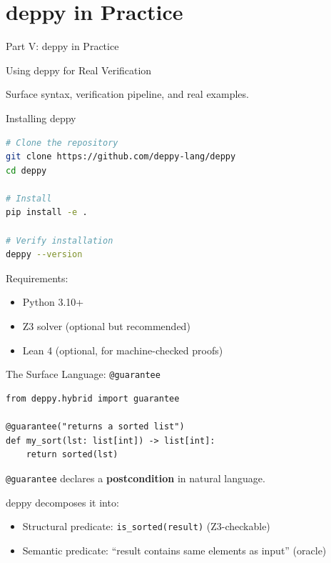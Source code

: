 \documentclass[aspectratio=169,11pt]{beamer}
\begin{document}

\part{deppy in Practice}

\begin{frame}{Part V: deppy in Practice}
\begin{center}
{\Large\color{blue} Using deppy for Real Verification}

\vspace{1em}
Surface syntax, verification pipeline, and real examples.
\end{center}
\end{frame}

\begin{frame}{Installing deppy}
\begin{lstlisting}[language=bash, basicstyle=\small\ttfamily]
# Clone the repository
git clone https://github.com/deppy-lang/deppy
cd deppy

# Install
pip install -e .

# Verify installation
deppy --version
\end{lstlisting}

\vspace{0.5em}
Requirements:
\begin{itemize}
\item Python 3.10+
\item Z3 solver (optional but recommended)
\item Lean 4 (optional, for machine-checked proofs)
\end{itemize}
\end{frame}

\begin{frame}{The Surface Language: \texttt{@guarantee}}
\begin{lstlisting}[language=deppy]
from deppy.hybrid import guarantee

@guarantee("returns a sorted list")
def my_sort(lst: list[int]) -> list[int]:
    return sorted(lst)
\end{lstlisting}

\vspace{0.5em}
\texttt{@guarantee} declares a \textbf{postcondition} in natural language.

\vspace{0.3em}
deppy decomposes it into:
\begin{itemize}
\item Structural predicate: \texttt{is\_sorted(result)} (Z3-checkable)
\item Semantic predicate: ``result contains same elements as input'' (oracle)
\end{itemize}
\end{frame}
\end{document}
